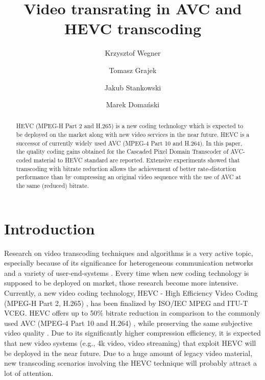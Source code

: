 \documentclass[twocolumn]{svjour3}          %
\begin{document}
\title{Video transrating in AVC and HEVC transcoding}


\author{Krzysztof Wegner \and Tomasz Grajek \and Jakub Stankowski \and 
Marek Doma\'nski}



\maketitle

\begin{abstract}
HEVC (MPEG-H Part 2 and H.265) is a new coding technology which is expected to be deployed on the market along with new video services in the near future. HEVC is a successor of currently widely used AVC (MPEG-4 Part 10 and H.264). In this paper, the quality coding gains obtained for the Cascaded Pixel Domain Transcoder of AVC-coded material to HEVC standard are reported. Extensive experiments showed that transcoding with bitrate reduction allows the achievement of better rate-distortion performance than by compressing an original video sequence with the use of AVC at the same (reduced) bitrate.

\end{abstract}

\section{Introduction}
\label{intro}
Research on video transcoding techniques and algorithms is a very active topic, especially because of its significance for heterogeneous communication networks and a variety of user-end-systems \cite{Ref:1,Ref:2,Ref:3}. Every time when new coding technology is supposed to be deployed on market, those research become more intensive. Currently, a new video coding technology, HEVC - High Efficiency Video Coding (MPEG-H Part 2, H.265) \cite{Ref:4}, has been finalized by ISO/IEC MPEG and ITU-T VCEG. HEVC offers up to 50\% bitrate reduction in comparison to the commonly used AVC (MPEG-4 Part 10 and H.264) \cite{Ref:5}, while preserving the same subjective video quality \cite{Ref:6}. Due to its significantly higher compression efficiency, it is expected that new video systems (e.g., 4k video, video streaming) that exploit HEVC will be deployed in the near future. Due to a huge amount of legacy video material, new transcoding scenarios involving the HEVC technique will probably attract a lot of attention.
\end{document}
